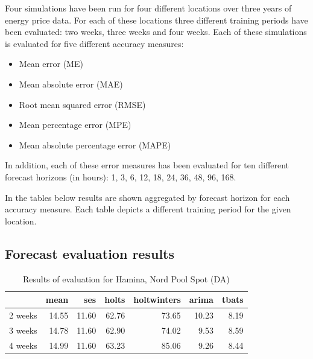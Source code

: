 

Four simulations have been run for four different locations over three years of energy price data. 
For each of these locations three different training periods have been evaluated: two weeks, three weeks and four weeks. 
Each of these simulations is evaluated for five different accuracy measures: 

\begin{itemize}
	\item Mean error (ME)
	\item Mean absolute error (MAE)
	\item Root mean squared error (RMSE)
	\item Mean percentage error (MPE)
	\item Mean absolute percentage error (MAPE)
\end{itemize}

In addition, each of these error measures has been evaluated for ten different forecast horizons (in hours): 
1, 3, 6, 12, 18, 24, 36, 48, 96, 168. 

In the tables below results are shown aggregated by forecast horizon for each accuracy measure. Each table depicts a different training period for the given location. 



\subsection{Forecast evaluation results}

\begin{table}[ht]
\centering
\begin{tabular}{rrrrrrr}
  \hline
 & mean & ses & holts & holtwinters & arima & tbats \\ 
  \hline
2 weeks & 14.55 & 11.60 & 62.76 & 73.65 & 10.23 & 8.19 \\ 
  3 weeks & 14.78 & 11.60 & 62.90 & 74.02 & 9.53 & 8.59 \\ 
  4 weeks & 14.99 & 11.60 & 63.23 & 85.06 & 9.26 & 8.44 \\ 
   \hline
\end{tabular}
\caption{Results of evaluation for Hamina, Nord Pool Spot (DA)} 
\end{table}



